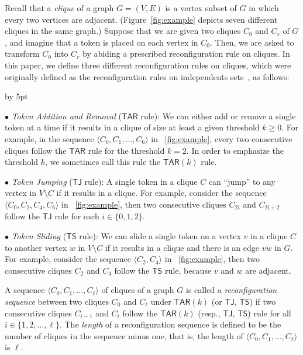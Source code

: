 \documentclass{llncs}
\newcommand{\TAR}[1]{\mathsf{TAR}(#1)}
\newcommand{\TS}{\mathsf{TS}}
\newcommand{\TJ}{\mathsf{TJ}}
\newcommand{\ini}{0}
\newcommand{\tar}{r}
\newcommand{\cliq}{C}
\newcommand{\TARrule}{\mathsf{TAR}}
\newcounter{one}
\newcounter{two}
\newcounter{three}
\begin{document}
	Recall that a {\em clique} of a graph $G = (V,E)$ is a vertex subset of $G$ in which every two vertices are adjacent. 
(Figure~\ref{fig:example} depicts seven different cliques in the same graph.)
	Suppose that we are given two cliques $\cliq_{\ini}$ and $\cliq_{\tar}$ of $G$, and imagine that a token is placed on each vertex in $\cliq_{\ini}$. 
	Then, we are asked to transform $\cliq_{\ini}$ into $\cliq_{\tar}$ by abiding a prescribed reconfiguration rule on cliques.
	In this paper, we define three different reconfiguration rules on cliques, which were originally defined as the reconfiguration rules on independents sets~\cite{KaminskiMM12}, as follows:
\begin{list}{*}{\settowidth{\labelwidth}{$\bullet$}\setlength{\leftmargin}{\labelwidth}\advance \leftmargin by 5pt
	\setlength{\itemsep}{5pt}\setlength{\parsep}{0pt}\setlength{\topsep}{5pt}\setlength{\parskip}{0pt}}
	\item[$\bullet$] {\em Token Addition and Removal} ($\TARrule$ rule): 
    We can either add or remove a single token at a time 
    if it results in a clique of size at least a given threshold $k \ge 0$. 
For example, in the sequence $\langle \cliq_{\ini}, \cliq_1, \ldots, \cliq_6 \rangle$ in \figurename~\ref{fig:example}, every two consecutive cliques follow the $\TARrule$ rule for the threshold $k = 2$.
    In order to emphasize the threshold $k$, we sometimes call this rule the $\TAR{k}$ rule. 

	\item[$\bullet$] {\em Token Jumping} ($\TJ$ rule): 
    A single token in a clique $\cliq$ can ``jump'' to any vertex in $V \setminus \cliq$ if it results in a clique.
    For example, consider the sequence $\langle \cliq_{\ini}, \cliq_2, \cliq_4, \cliq_6 \rangle$ in \figurename~\ref{fig:example}, then two consecutive cliques $\cliq_{2i}$ and $\cliq_{2i+2}$ follow the $\TJ$ rule for each $i \in \{0,1,2\}$.

	\item[$\bullet$]{\em Token Sliding} ($\TS$ rule): 
    We can slide a single token on a vertex $v$ in a clique $\cliq$ to another vertex $w$ in $V \setminus \cliq$ if  it results in a clique and there is an edge $vw$ in $G$.
    For example, consider the sequence $\langle \cliq_2, \cliq_4 \rangle$ in \figurename~\ref{fig:example}, then two consecutive cliques $\cliq_{2}$ and $\cliq_{4}$ follow the $\TS$ rule, because $v$ and $w$ are adjacent.
	\end{list}
	A sequence $\langle \cliq_{\ini}, \cliq_1, \ldots, \cliq_{\ell} \rangle$ of cliques of a graph $G$ is called a {\em reconfiguration sequence} between two cliques $\cliq_{\ini}$ and $\cliq_{\ell}$ under $\TAR{k}$ (or $\TJ$, $\TS$) if two consecutive cliques $\cliq_{i-1}$ and $\cliq_i$ follow the $\TAR{k}$ (resp., $\TJ$, $\TS$) rule for all $i \in \{1, 2, \ldots, \ell\}$.
	The \emph{length} of a reconfiguration sequence is defined to be the number of cliques in the sequence minus one, that is, the length of  $\langle \cliq_{\ini}, \cliq_1, \ldots, \cliq_{\ell} \rangle$ is $\ell$.
\end{document}

